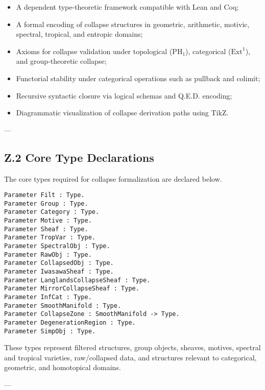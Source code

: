 \documentclass[11pt]{article}
\begin{document}
\begin{itemize}
  \item A dependent type-theoretic framework compatible with Lean and Coq;
  \item A formal encoding of collapse structures in geometric, arithmetic, motivic, spectral, tropical, and entropic domains;
  \item Axioms for collapse validation under topological (\( \mathrm{PH}_1 \)), categorical (\( \mathrm{Ext}^1 \)), and group-theoretic collapse;
  \item Functorial stability under categorical operations such as pullback and colimit;
  \item Recursive syntactic closure via logical schemas and Q.E.D. encoding;
  \item Diagrammatic visualization of collapse derivation paths using TikZ.
\end{itemize}

---

\subsection*{Z.2 Core Type Declarations}

The core types required for collapse formalization are declared below.

\begin{lstlisting}[language=Coq]
Parameter Filt : Type.
Parameter Group : Type.
Parameter Category : Type.
Parameter Motive : Type.
Parameter Sheaf : Type.
Parameter TropVar : Type.
Parameter SpectralObj : Type.
Parameter RawObj : Type.
Parameter CollapsedObj : Type.
Parameter IwasawaSheaf : Type.
Parameter LanglandsCollapseSheaf : Type.
Parameter MirrorCollapseSheaf : Type.
Parameter InfCat : Type.
Parameter SmoothManifold : Type.
Parameter CollapseZone : SmoothManifold -> Type.
Parameter DegenerationRegion : Type.
Parameter SimpObj : Type.
\end{lstlisting}

These types represent filtered structures, group objects, sheaves, motives, spectral and tropical varieties, raw/collapsed data, and structures relevant to categorical, geometric, and homotopical domains.

---

\end{document}
